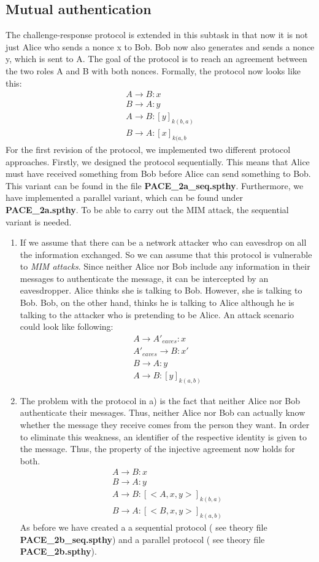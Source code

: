 \documentclass[a4paper,11pt]{scrartcl}
\begin{document}
\subsection{Mutual authentication}
The challenge-response protocol is extended in this subtask in that now it is not just Alice who sends a nonce x to Bob.  Bob now also generates and sends a nonce y,  which is sent to A. The goal of the protocol is to reach an agreement between the two roles A and B with both nonces. Formally, the protocol now looks like this:
\begin{align*}
A \rightarrow B: x\\
B \rightarrow A: y\\
A \rightarrow B: [y]_{k(b,a)}\\
B \rightarrow A: [x]_{k(a,b}
\end{align*}
For the first revision of the protocol, we implemented two different protocol approaches. Firstly, we designed the protocol sequentially. This means that Alice must have received something from Bob before Alice can send something to Bob. This variant can be found in the file \textbf{PACE_2a_seq.spthy}. Furthermore, we have implemented a parallel variant, which can be found under \textbf{PACE_2a.spthy}. To be able to carry out the MIM attack, the sequential variant is needed.
\begin{enumerate}[label=\alph*)]
	\item If we assume that there can be a network attacker who can eavesdrop on all the information exchanged.  So we can assume that this protocol is vulnerable to \textit{
	MIM attacks}. Since neither Alice nor Bob include any information in their messages to authenticate the message, it can be intercepted by an eavesdropper. Alice thinks she is    	talking to Bob. However, she is talking to Bob. Bob, on the other hand, thinks he is talking to Alice although he is talking to the attacker who is pretending to be Alice.
	An attack scenario could look like following:
	\begin{align*}
	A \rightarrow A'_{eaves}: x\\
	A'_{eaves} \rightarrow B: x'\\
	B \rightarrow A : y\\
	A \rightarrow B : [y]_{k(a,b)}
	\end{align*}
	\item The problem with the protocol in a) is the fact that neither Alice nor Bob authenticate their messages. Thus, neither Alice nor Bob can actually know whether the	    				message they receive comes from the person they want. In order to eliminate this weakness, an identifier of the respective identity is given to the message. Thus, the property 		of the injective agreement now holds for both.
	\begin{align*}
	A \rightarrow B: x\\
	B \rightarrow A: y\\
	A \rightarrow B: [<A, x, y>]_{k(b,a)}\\
	B \rightarrow A: [<B, x, y>]_{k(a,b)}
	\end{align*}
	As before we have created a a sequential protocol ( see theory file \textbf{PACE_2b_seq.spthy}) and a parallel protocol ( see theory file \textbf{PACE_2b.spthy}).
\end{enumerate}
\end{document}
